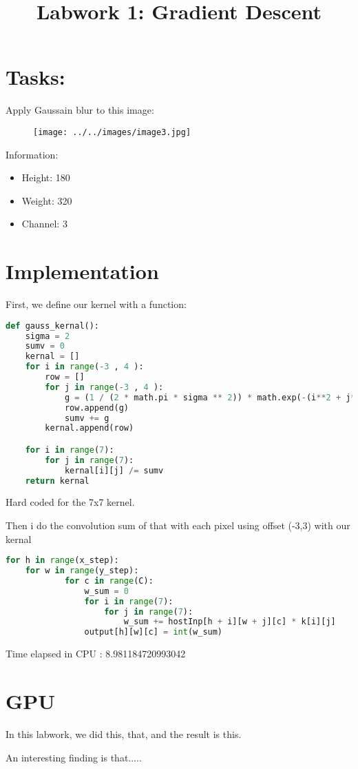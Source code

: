 \documentclass{article}
\title{Labwork 1: Gradient Descent}
\begin{document}
\maketitle

\setlength\parindent{0pt}

\section{Tasks:}

Apply Gaussain blur to this image:

\begin{figure}[H]
    \centering
    \texttt{[image: ../../images/image3.jpg]}
\end{figure} 
Information: 
\begin{itemize}
    \item Height: 180
    \item Weight: 320
    \item Channel: 3
\end{itemize}

\section{Implementation}
First, we define our kernel with a function:

\begin{lstlisting}[language=Python]
    def gauss_kernal():
    sigma = 2
    sumv = 0
    kernal = []
    for i in range(-3 , 4 ):
        row = []
        for j in range(-3 , 4 ):
            g = (1 / (2 * math.pi * sigma ** 2)) * math.exp(-(i**2 + j**2) / (2 * sigma ** 2))
            row.append(g)
            sumv += g
        kernal.append(row)

    for i in range(7):
        for j in range(7):
            kernal[i][j] /= sumv
    return kernal
\end{lstlisting} 


Hard coded for the 7x7 kernel.

Then i do the convolution sum of that with each pixel using offset (-3,3) with our kernal
\begin{lstlisting}[language=Python]
    for h in range(x_step):
    for w in range(y_step):
            for c in range(C):  
                w_sum = 0
                for i in range(7):
                    for j in range(7):
                        w_sum += hostInp[h + i][w + j][c] * k[i][j]
                output[h][w][c] = int(w_sum)
\end{lstlisting} 
 
Time elapsed in CPU : 8.981184720993042

\section{GPU}




In this labwork, we did this, that, and the result is this.

An interesting finding is that.....
\end{document}
